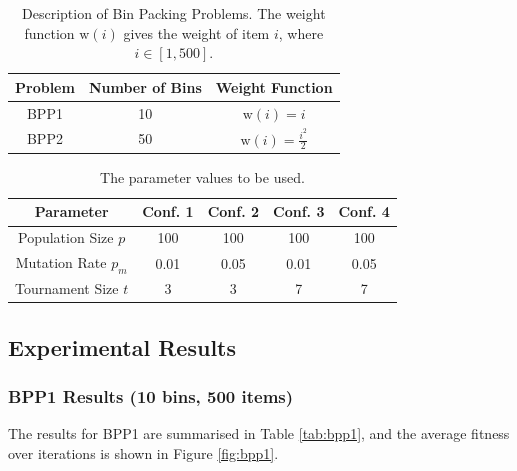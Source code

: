 \documentclass[conference]{IEEEtran}
\begin{document}
\begin{table}[htbp]
    \caption{Description of Bin Packing Problems. The weight function \(\text{w}(i)\) gives the weight of item \(i\), where \(i \in [1, 500]\).}
    \begin{center}
        \begin{tabular}{|c|c|c|}
            \hline
            \textbf{Problem} & \textbf{Number of Bins} & \textbf{Weight Function}        \\
            \hline
            BPP1             & 10                      & \(\text{w}(i) = i\)             \\
            \hline
            BPP2             & 50                      & \(\text{w}(i) = \frac{i^2}{2}\) \\
            \hline
        \end{tabular}
        \label{tab:problems}
    \end{center}
\end{table}

\begin{table}[htbp]
    \centering
    \caption{The parameter values to be used.}
    \begin{tabular}{|c|c|c|c|c|}
        \hline
        \textbf{Parameter}    & \textbf{Conf. 1} & \textbf{Conf. 2} & \textbf{Conf. 3} & \textbf{Conf. 4} \\
        \hline
        Population Size \(p\) & 100              & 100              & 100              & 100              \\
        \hline
        Mutation Rate \(p_m\) & 0.01             & 0.05             & 0.01             & 0.05             \\
        \hline
        Tournament Size \(t\) & 3                & 3                & 7                & 7                \\
        \hline
    \end{tabular}
    \label{tab:params}
\end{table}

\subsection{Experimental Results}
\subsubsection{BPP1 Results (10 bins, 500 items)}
The results for BPP1 are summarised in Table \ref{tab:bpp1}, and the average fitness over iterations is shown in Figure \ref{fig:bpp1}.
\end{document}
